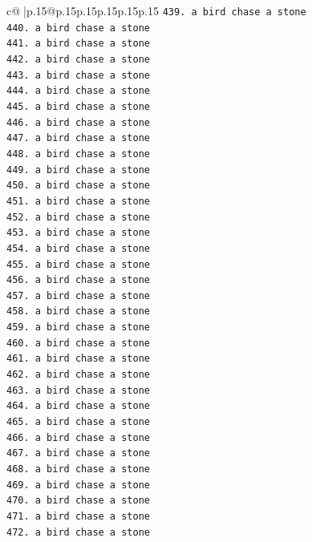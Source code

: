 \documentclass{article}
\begin{document}
{\begin{supertabular}{c@{$\;$}|p{.15\linewidth}@{}p{.15\linewidth}p{.15\linewidth}p{.15\linewidth}p{.15\linewidth}p{.15\linewidth}}
{{{\texttt{439. a bird chase a stone} \\
\texttt{440. a bird chase a stone} \\
\texttt{441. a bird chase a stone} \\
\texttt{442. a bird chase a stone} \\
\texttt{443. a bird chase a stone} \\
\texttt{444. a bird chase a stone} \\
\texttt{445. a bird chase a stone} \\
\texttt{446. a bird chase a stone} \\
\texttt{447. a bird chase a stone} \\
\texttt{448. a bird chase a stone} \\
\texttt{449. a bird chase a stone} \\
\texttt{450. a bird chase a stone} \\
\texttt{451. a bird chase a stone} \\
\texttt{452. a bird chase a stone} \\
\texttt{453. a bird chase a stone} \\
\texttt{454. a bird chase a stone} \\
\texttt{455. a bird chase a stone} \\
\texttt{456. a bird chase a stone} \\
\texttt{457. a bird chase a stone} \\
\texttt{458. a bird chase a stone} \\
\texttt{459. a bird chase a stone} \\
\texttt{460. a bird chase a stone} \\
\texttt{461. a bird chase a stone} \\
\texttt{462. a bird chase a stone} \\
\texttt{463. a bird chase a stone} \\
\texttt{464. a bird chase a stone} \\
\texttt{465. a bird chase a stone} \\
\texttt{466. a bird chase a stone} \\
\texttt{467. a bird chase a stone} \\
\texttt{468. a bird chase a stone} \\
\texttt{469. a bird chase a stone} \\
\texttt{470. a bird chase a stone} \\
\texttt{471. a bird chase a stone} \\
\texttt{472. a bird chase a stone} \\
}}}
\end{supertabular}}
\end{document}
